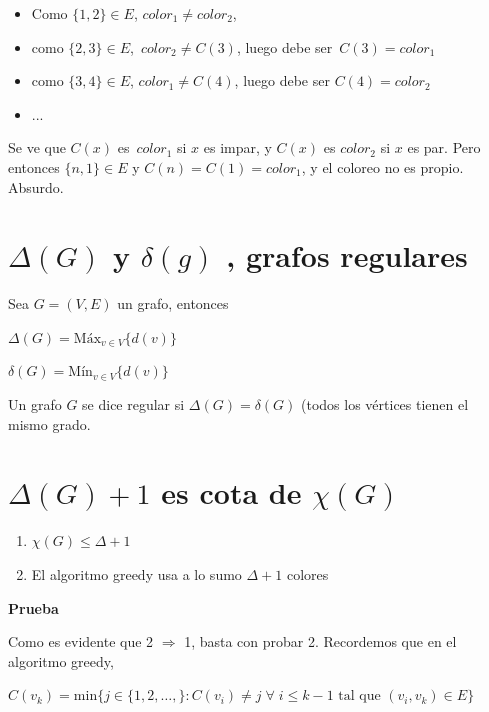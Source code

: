 \documentclass[10pt,a4paper]{article}
\begin{document}
\begin{itemize}

	\item Como $\{1, 2\} \in E$, $color_1 \neq color_2$,
	\item como $\{2, 3\}\in E$, $color_2 \neq C(3)$, luego debe ser $C(3) = color_1$
	\item como $\{3, 4\} \in E$, $color_1\neq C(4)$, luego debe ser $C(4) = color_2$
	\item ...
\end{itemize}

Se ve que $C(x)$ es $color_1$ si $x$ es impar, y $C(x) $ es $color_2$ si $x$ es par. Pero entonces $\{n, 1\} \in E$ y $C(n) = C(1) = color_1$, y el coloreo no es propio. Absurdo.

\section*{$\Delta(G)$ y $\delta(g)$ , grafos regulares}

Sea $G=(V, E)$ un grafo, entonces

\begin{center}
$\Delta(G) = \text{Máx}_{v \in V}\{d(v)\}$
\end{center}

\begin{center}
$\delta(G) = \text{Mín}_{v \in V}\{d(v)\}$
\end{center}

Un grafo $G$ se dice regular si $\Delta(G) = \delta(G)$ (todos los vértices tienen el mismo grado.

\section*{$\Delta(G) + 1$ es cota de $\chi(G)$}

\begin{enumerate}

	\item $\chi(G) \leq \Delta + 1$
	\item El algoritmo greedy usa a lo sumo $\Delta + 1$ colores
\end{enumerate}

\textbf{Prueba}

Como es evidente que 2 $\Rightarrow$ 1, basta con probar 2. Recordemos que en el algoritmo greedy,

\begin{center}
$C(v_k) = \text{min}\{j \in \{1, 2, \dots, \} :C(v_i) \neq j\;\forall\; i \leq k -1 \text{ tal que } (v_i, v_k) \in E\}$
\end{center}
\end{document}
